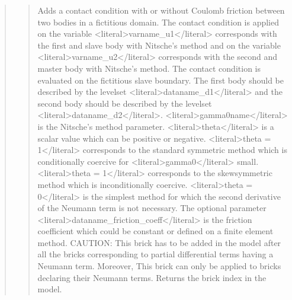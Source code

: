 \documentclass[a4paper,11pt,english]{sphinxmanual}
\begin{document}
\begin{quote}
\begin{quote}
\sphinxAtStartPar
Adds a contact condition with or without Coulomb friction between
two bodies in a fictitious domain. The contact condition is applied on
the variable \textless{}literal\textgreater{}varname\_u1\textless{}/literal\textgreater{} corresponds with the first and slave body
with Nitsche’s method and on the variable \textless{}literal\textgreater{}varname\_u2\textless{}/literal\textgreater{} corresponds
with the second and master body with Nitsche’s method.
The contact condition is evaluated on the fictitious slave boundary.
The first body should be described by the level\sphinxhyphen{}set \textless{}literal\textgreater{}dataname\_d1\textless{}/literal\textgreater{}
and the second body should be described by the level\sphinxhyphen{}set \textless{}literal\textgreater{}dataname\_d2\textless{}/literal\textgreater{}.
\textless{}literal\textgreater{}gamma0name\textless{}/literal\textgreater{} is the Nitsche’s method parameter.
\textless{}literal\textgreater{}theta\textless{}/literal\textgreater{} is a scalar value which can be positive or negative.
\textless{}literal\textgreater{}theta = 1\textless{}/literal\textgreater{} corresponds to the standard symmetric method which is
conditionally coercive for  \textless{}literal\textgreater{}gamma0\textless{}/literal\textgreater{} small.
\textless{}literal\textgreater{}theta = \sphinxhyphen{}1\textless{}/literal\textgreater{} corresponds to the skew\sphinxhyphen{}symmetric method which is inconditionally coercive.
\textless{}literal\textgreater{}theta = 0\textless{}/literal\textgreater{} is the simplest method for which the second derivative of
the Neumann term is not necessary. The optional parameter \textless{}literal\textgreater{}dataname\_friction\_coeff\textless{}/literal\textgreater{}
is the friction coefficient which could be constant or defined on a finite element method.
CAUTION: This brick has to be added in the model after all the bricks
corresponding to partial differential terms having a Neumann term.
Moreover, This brick can only be applied to bricks declaring their
Neumann terms. Returns the brick index in the model.
\end{quote}

\sphinxAtStartPar
{}
\begin{quote}


\end{quote}
\end{quote}
\end{document}
